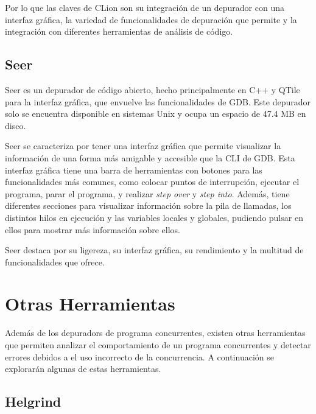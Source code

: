 Por lo que las claves de CLion son su integración de un \gls{depurador} con una \gls{interfaz gráfica}, la variedad de funcionalidades de depuración que permite y la integración con diferentes herramientas de análisis de código.


\subsection{Seer}{\label{subsec:seer}}
Seer es un depurador de código abierto, hecho principalmente en C++ y QTile para la \gls{interfaz gráfica}, que envuelve las funcionalidades de GDB. Este \gls{depurador} solo se encuentra disponible en sistemas Unix y ocupa un espacio de 47.4 MB en disco. 

Seer se caracteriza por tener una \gls{interfaz gráfica} que permite visualizar la información de una forma más amigable y accesible que la \gls{CLI} de GDB. Esta interfaz gráfica tiene una barra de herramientas con botones para las funcionalidades más comunes, como colocar puntos de interrupción, ejecutar el programa, parar el programa, y realizar \textit{\gls{step over}} y \textit{\gls{step into}}. Además, tiene diferentes secciones para visualizar información sobre la pila de llamadas, los distintos \glspl{hilo} en ejecución y las variables locales y globales, pudiendo pulsar en ellos para mostrar más información sobre ellos.

Seer destaca por su ligereza, su \gls{interfaz gráfica}, su rendimiento y la multitud de funcionalidades que ofrece.


\section{Otras Herramientas}\label{sec:herramientas}

Además de los \glspl{depurador} de \glspl{programa concurrente}, existen otras herramientas que permiten analizar el comportamiento de un \glspl{programa concurrente} y detectar errores debidos a el uso incorrecto de la \gls{concurrencia}. A continuación se explorarán algunas de estas herramientas.

\subsection{Helgrind}{\label{subsec:helgrind}}

